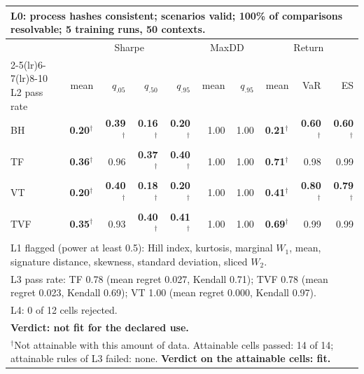 \begin{tabular}{lrrrrrrrrr}
\toprule
\multicolumn{10}{p{13.5cm}}{L0: process hashes consistent; scenarios valid; 100\% of comparisons resolvable; 5 training runs, 50 contexts.} \\
\midrule
 & \multicolumn{4}{c}{Sharpe} & \multicolumn{2}{c}{MaxDD} & \multicolumn{3}{c}{Return} \\
\cmidrule(lr){2-5}\cmidrule(lr){6-7}\cmidrule(lr){8-10}
L2 pass rate & mean & $q_{.05}$ & $q_{.50}$ & $q_{.95}$ & mean & $q_{.95}$ & mean & VaR & ES \\
\midrule
BH & \textbf{0.20}$^{\dagger}$ & \textbf{0.39}$^{\dagger}$ & \textbf{0.16}$^{\dagger}$ & \textbf{0.20}$^{\dagger}$ & 1.00 & 1.00 & \textbf{0.21}$^{\dagger}$ & \textbf{0.60}$^{\dagger}$ & \textbf{0.60}$^{\dagger}$ \\
TF & \textbf{0.36}$^{\dagger}$ & 0.96 & \textbf{0.37}$^{\dagger}$ & \textbf{0.40}$^{\dagger}$ & 1.00 & 1.00 & \textbf{0.71}$^{\dagger}$ & 0.98 & 0.99 \\
VT & \textbf{0.20}$^{\dagger}$ & \textbf{0.40}$^{\dagger}$ & \textbf{0.18}$^{\dagger}$ & \textbf{0.20}$^{\dagger}$ & 1.00 & 1.00 & \textbf{0.41}$^{\dagger}$ & \textbf{0.80}$^{\dagger}$ & \textbf{0.79}$^{\dagger}$ \\
TVF & \textbf{0.35}$^{\dagger}$ & 0.93 & \textbf{0.40}$^{\dagger}$ & \textbf{0.41}$^{\dagger}$ & 1.00 & 1.00 & \textbf{0.69}$^{\dagger}$ & 0.99 & 0.99 \\
\midrule
\multicolumn{10}{p{13.5cm}}{L1 flagged (power at least 0.5): Hill index, kurtosis, marginal $W_1$, mean, signature distance, skewness, standard deviation, sliced $W_2$.} \\
\multicolumn{10}{p{13.5cm}}{L3 pass rate: TF 0.78 (mean regret 0.027, Kendall 0.71); TVF 0.78 (mean regret 0.023, Kendall 0.69); VT 1.00 (mean regret 0.000, Kendall 0.97).} \\
\multicolumn{10}{p{13.5cm}}{L4: 0 of 12 cells rejected.} \\
\multicolumn{10}{p{13.5cm}}{\textbf{Verdict: not fit for the declared use.}} \\
\multicolumn{10}{p{13.5cm}}{$^{\dagger}$Not attainable with this amount of data. Attainable cells passed: 14 of 14; attainable rules of L3 failed: none. \textbf{Verdict on the attainable cells: fit.}} \\
\bottomrule
\end{tabular}

